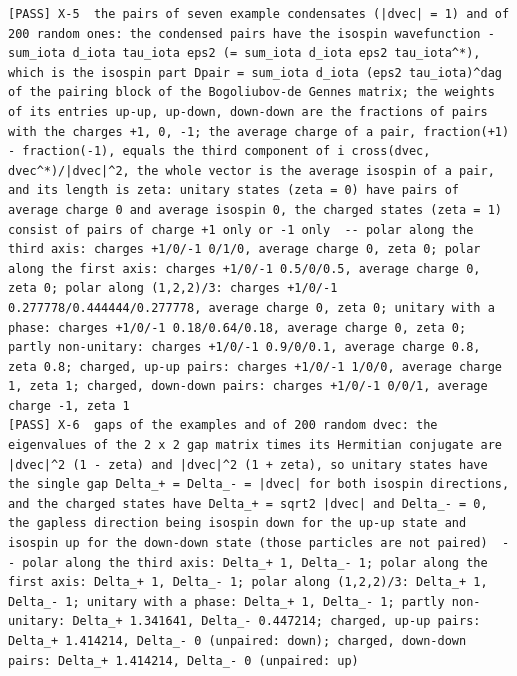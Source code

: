 \documentclass[
  10pt,
]{article}
\begin{document}
\begin{verbatim}
[PASS] X-5  the pairs of seven example condensates (|dvec| = 1) and of 200 random ones: the condensed pairs have the isospin wavefunction -sum_iota d_iota tau_iota eps2 (= sum_iota d_iota eps2 tau_iota^*), which is the isospin part Dpair = sum_iota d_iota (eps2 tau_iota)^dag of the pairing block of the Bogoliubov-de Gennes matrix; the weights of its entries up-up, up-down, down-down are the fractions of pairs with the charges +1, 0, -1; the average charge of a pair, fraction(+1) - fraction(-1), equals the third component of i cross(dvec, dvec^*)/|dvec|^2, the whole vector is the average isospin of a pair, and its length is zeta: unitary states (zeta = 0) have pairs of average charge 0 and average isospin 0, the charged states (zeta = 1) consist of pairs of charge +1 only or -1 only  -- polar along the third axis: charges +1/0/-1 0/1/0, average charge 0, zeta 0; polar along the first axis: charges +1/0/-1 0.5/0/0.5, average charge 0, zeta 0; polar along (1,2,2)/3: charges +1/0/-1 0.277778/0.444444/0.277778, average charge 0, zeta 0; unitary with a phase: charges +1/0/-1 0.18/0.64/0.18, average charge 0, zeta 0; partly non-unitary: charges +1/0/-1 0.9/0/0.1, average charge 0.8, zeta 0.8; charged, up-up pairs: charges +1/0/-1 1/0/0, average charge 1, zeta 1; charged, down-down pairs: charges +1/0/-1 0/0/1, average charge -1, zeta 1
[PASS] X-6  gaps of the examples and of 200 random dvec: the eigenvalues of the 2 x 2 gap matrix times its Hermitian conjugate are |dvec|^2 (1 - zeta) and |dvec|^2 (1 + zeta), so unitary states have the single gap Delta_+ = Delta_- = |dvec| for both isospin directions, and the charged states have Delta_+ = sqrt2 |dvec| and Delta_- = 0, the gapless direction being isospin down for the up-up state and isospin up for the down-down state (those particles are not paired)  -- polar along the third axis: Delta_+ 1, Delta_- 1; polar along the first axis: Delta_+ 1, Delta_- 1; polar along (1,2,2)/3: Delta_+ 1, Delta_- 1; unitary with a phase: Delta_+ 1, Delta_- 1; partly non-unitary: Delta_+ 1.341641, Delta_- 0.447214; charged, up-up pairs: Delta_+ 1.414214, Delta_- 0 (unpaired: down); charged, down-down pairs: Delta_+ 1.414214, Delta_- 0 (unpaired: up)

\end{verbatim}
\end{document}
